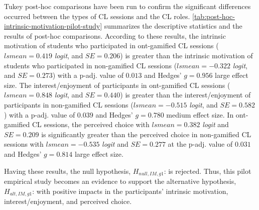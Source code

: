 Tukey post-hoc comparisons have been run to confirm the significant differences occurred between the types of CL sessions and the CL roles.
\autoref{tab:post-hoc-intrinsic-motivation-pilot-study} summarizes the descriptive statistics and the results of post-hoc comparisons.
According to these results, the intrinsic motivation of students who participated in ont-gamified CL sessions ($lsmean = 0.419$ \emph{logit}, and $SE = 0.206$) is greater than the intrinsic motivation of students who participated in non-gamified CL sessions ($lsmean = -0.322$ \emph{logit}, and $SE = 0.273$) with a p-adj. value of $0.013$ and Hedges' $g=0.956$ large effect size.
The interest/enjoyment of participants in ont-gamified CL sessions ($lsmean = 0.848$ \emph{logit}, and $SE = 0.440$) is greater than the interest/enjoyment of participants in non-gamified CL sessions ($lsmean = -0.515$ \emph{logit}, and $SE = 0.582$) with a p-adj. value of $0.039$ and Hedges' $g=0.780$ medium effect size.
In ont-gamified CL sessions, the perceived choice with $lsmean = 0.382$ \emph{logit} and $SE = 0.209$ is significantly greater than the perceived choice in non-gamified CL sessions with $lsmean = -0.535$ \emph{logit} and $SE = 0.277$ at the p-adj. value of $0.031$ and Hedges' $g = 0.814$ large effect size.

Having these results, the null hypothesis, $H_{null,IM,g1}$:  is rejected.
Thus, this pilot empirical study becomes an evidence to support the alternative hypothesis, $H_{alt,IM,g1}$:  with positive impacts in the participants' intrinsic motivation, interest/enjoyment, and perceived choice.

